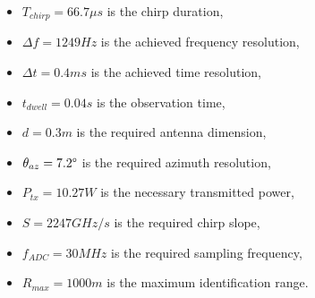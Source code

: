 \begin{itemize}
    
    \item $T_{chirp} = 66.7 \mu s$ is the chirp duration,
    
    \item $\Delta f = 1249 Hz$ is the achieved frequency resolution,
    
    \item $\Delta t = 0.4 ms$ is the achieved time resolution,
    
    \item $t_{dwell} = 0.04s$ is the observation time,

    \item $d = 0.3 m$ is the required antenna dimension,
         
    \item $\theta_{az} = 7.2\degree$ is the required azimuth resolution,

    \item $P_{tx} = 10.27 W$ is the necessary transmitted power,
    
    \item $S = 2247 GHz/s$ is the required chirp slope,
    
    \item $f_{ADC} = 30 MHz$ is the required sampling frequency,
    
    \item $R_{max} = 1000 m$ is the maximum identification range.

    
\end{itemize}

